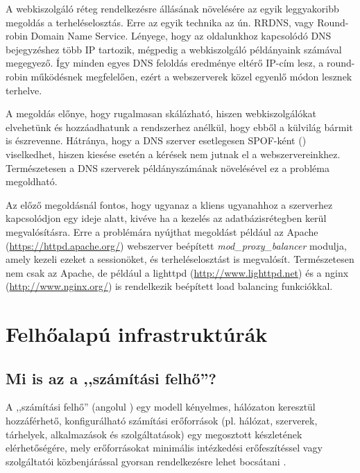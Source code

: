 A webkiszolgáló réteg rendelkezésre állásának növelésére az egyik leggyakoribb megoldás a terheléselosztás. Erre az egyik technika az ún. RRDNS, vagy Round-robin Domain Name Service. Lényege, hogy az oldalunkhoz kapcsolódó DNS bejegyzéshez több IP tartozik, mégpedig a webkiszolgáló példányaink számával megegyező. Így minden egyes DNS feloldás eredménye eltérő IP-cím lesz, a round-robin működésnek megfelelően, ezért a webszerverek közel egyenlő módon lesznek terhelve.

A megoldás előnye, hogy rugalmasan skálázható, hiszen webkiszolgálókat elvehetünk és hozzáadhatunk a rendszerhez anélkül, hogy ebből a külvilág bármit is észrevenne. Hátránya, hogy a DNS szerver esetlegesen SPOF-ként () viselkedhet, hiszen kiesése esetén a kérések nem jutnak el a webszervereinkhez. Természetesen a DNS szerverek példányszámának növelésével ez a probléma megoldható.

Az előző megoldásnál fontos, hogy ugyanaz a kliens ugyanahhoz a szerverhez kapcsolódjon egy  ideje alatt, kivéve ha a  kezelés az adatbázisrétegben kerül megvalósításra.
Erre a problémára nyújthat megoldást például az Apache (\href{https://httpd.apache.org/}{https://httpd.apache.org/}) webszerver beépített \textit{mod\_proxy\_balancer} modulja, amely kezeli ezeket a sessionöket, és terheléselosztást is megvalósít. Természetesen nem csak az Apache, de például a lighttpd (\href{http://www.lighttpd.net}{http://www.lighttpd.net}) és a nginx (\href{http://www.nginx.org/}{http://www.nginx.org/}) is rendelkezik beépített load balancing funkciókkal.

\section{Felhőalapú infrastruktúrák}
\subsection{Mi is az a ,,számítási felhő''?}

A ,,számítási felhő'' (angolul ) egy modell kényelmes, hálózaton keresztül hozzáférhető, konfigurálható számítási erőforrások (pl. hálózat, szerverek, tárhelyek, alkalmazások és szolgáltatások) egy megosztott készletének elérhetőségére, mely erőforrásokat minimális intézkedési erőfeszítéssel vagy szolgáltatói közbenjárással gyorsan rendelkezésre lehet bocsátani \cite{nistsp800-145}.


